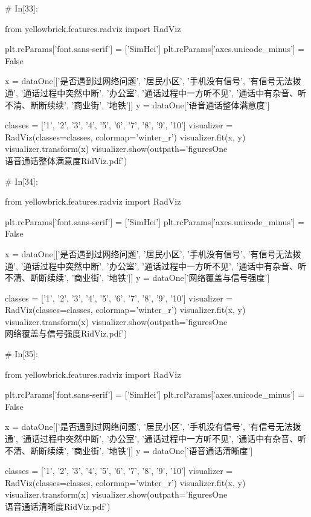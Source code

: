 \documentclass{MathorCupmodeling}
\begin{document}
\begin{python}
	# In[33]:
	
	
	from yellowbrick.features.radviz import RadViz
	
	plt.rcParams['font.sans-serif'] = ['SimHei']
	plt.rcParams['axes.unicode_minus'] = False
	
	x = dataOne[['是否遇到过网络问题', '居民小区', '手机没有信号', '有信号无法拨通', '通话过程中突然中断', '办公室', '通话过程中一方听不见', '通话中有杂音、听不清、断断续续', '商业街', '地铁']]
	y = dataOne['语音通话整体满意度']
	
	classes = ['1', '2', '3', '4', '5', '6', '7', '8', '9', '10']
	visualizer = RadViz(classes=classes, colormap='winter_r')
	visualizer.fit(x, y)
	visualizer.transform(x)
	visualizer.show(outpath='figuresOne\\[附件1]语音通话整体满意度RidViz.pdf')
	
	# In[34]:
	
	
	from yellowbrick.features.radviz import RadViz
	
	plt.rcParams['font.sans-serif'] = ['SimHei']
	plt.rcParams['axes.unicode_minus'] = False
	
	x = dataOne[['是否遇到过网络问题', '居民小区', '手机没有信号', '有信号无法拨通', '通话过程中突然中断', '办公室', '通话过程中一方听不见', '通话中有杂音、听不清、断断续续', '商业街', '地铁']]
	y = dataOne['网络覆盖与信号强度']
	
	classes = ['1', '2', '3', '4', '5', '6', '7', '8', '9', '10']
	visualizer = RadViz(classes=classes, colormap='winter_r')
	visualizer.fit(x, y)
	visualizer.transform(x)
	visualizer.show(outpath='figuresOne\\[附件1]网络覆盖与信号强度RidViz.pdf')
	
	# In[35]:
	
	
	from yellowbrick.features.radviz import RadViz
	
	plt.rcParams['font.sans-serif'] = ['SimHei']
	plt.rcParams['axes.unicode_minus'] = False
	
	x = dataOne[['是否遇到过网络问题', '居民小区', '手机没有信号', '有信号无法拨通', '通话过程中突然中断', '办公室', '通话过程中一方听不见', '通话中有杂音、听不清、断断续续', '商业街', '地铁']]
	y = dataOne['语音通话清晰度']
	
	classes = ['1', '2', '3', '4', '5', '6', '7', '8', '9', '10']
	visualizer = RadViz(classes=classes, colormap='winter_r')
	visualizer.fit(x, y)
	visualizer.transform(x)
	visualizer.show(outpath='figuresOne\\[附件1]语音通话清晰度RidViz.pdf')
	

\end{python}
\end{document}
